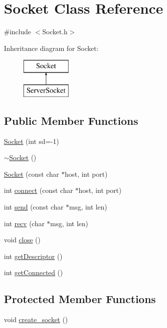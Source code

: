 \hypertarget{classSocket}{}\section{Socket Class Reference}
\label{classSocket}


{\ttfamily \#include $<$Socket.\+h$>$}

Inheritance diagram for Socket\+:\begin{figure}[H]
\begin{center}
\leavevmode
\includegraphics[height=2.000000cm]{classSocket}
\end{center}
\end{figure}
\subsection*{Public Member Functions}
\begin{DoxyCompactItemize}
\item 
\hyperlink{classSocket_a93c96fe7bea2fc834c88786629fa041e}{Socket} (int sd=-\/1)
\item 
\hyperlink{classSocket_aeac4eb6379a543d38ed88977d3b6630a}{$\sim$\+Socket} ()
\item 
\hyperlink{classSocket_a9016e6a1e5ae817f917449d5e3a7a380}{Socket} (const char $\ast$host, int port)
\item 
int \hyperlink{classSocket_abc97e53080c01a06cc8f5efea7c6cdf0}{connect} (const char $\ast$host, int port)
\item 
int \hyperlink{classSocket_aca3e5b9c5459a50bd8fb03d29ef9e48e}{send} (const char $\ast$msg, int len)
\item 
int \hyperlink{classSocket_a1830972b26797cde234054f81f0921de}{recv} (char $\ast$msg, int len)
\item 
void \hyperlink{classSocket_a75ee749264ccbcfc4dfbf5442e55dcb8}{close} ()
\item 
int \hyperlink{classSocket_a378077061dfb9c50e9db4b0d84ff2b03}{get\+Descriptor} ()
\item 
int \hyperlink{classSocket_a2b89fc6d75015cbf6abe93b2b9994ef4}{get\+Connected} ()
\end{DoxyCompactItemize}
\subsection*{Protected Member Functions}
\begin{DoxyCompactItemize}
\item 
void \hyperlink{classSocket_a23f2fbf5f8449277c7d140f32d12fca3}{create\+\_\+socket} ()
\end{DoxyCompactItemize}
